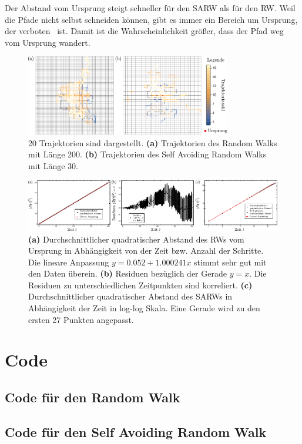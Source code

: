 \documentclass[prb,12pt]{revtex4-2}
\theoremstyle{definition}
\theoremstyle{definition}
\begin{document}
Der Abstand vom Ursprung steigt schneller für den SARW als für den RW. Weil die Pfade nicht selbst schneiden können, gibt es immer ein Bereich um Ursprung, der \glqq verboten\grqq~  ist. Damit ist die Wahrscheinlichkeit größer, dass der Pfad weg vom Ursprung wandert. 
\begin{figure}
	\centering
	\includegraphics[width=0.8\textwidth]{fig1.pdf}
	\caption{20 Trajektorien sind dargestellt. \textbf{(a)} Trajektorien des Random Walks mit L\"{a}nge 200. \textbf{(b)} Trajektorien des Self Avoiding Random Walks mit L\"{a}nge 30. }
	\label{fig:trajectories}
\end{figure}
\begin{figure}
	\centering
	\includegraphics[width=\textwidth]{fig2.pdf}
	\caption{\textbf{(a)} Durchschnittlicher quadratischer Abstand des RWs vom Ursprung in Abhängigkeit von der Zeit bzw. Anzahl der Schritte. Die lineare Anpassung $y=0.052 + 1.000241x$ stimmt sehr gut mit den Daten überein. \textbf{(b)} Residuen bezüglich der Gerade $y=x$. Die Residuen zu unterschiedlichen Zeitpunkten sind korreliert. \textbf{(c)} Durchschnittlicher quadratischer Abstand des SARWs in Abhängigkeit der Zeit in log-log Skala. Eine Gerade wird zu den ersten 27 Punkten angepasst.}
	\label{fig:plots}
\end{figure}

\appendix
\section{Code}\label{sec:code}
\subsection{Code für den Random Walk}

\subsection{Code für den Self Avoiding Random Walk}

\end{document}
